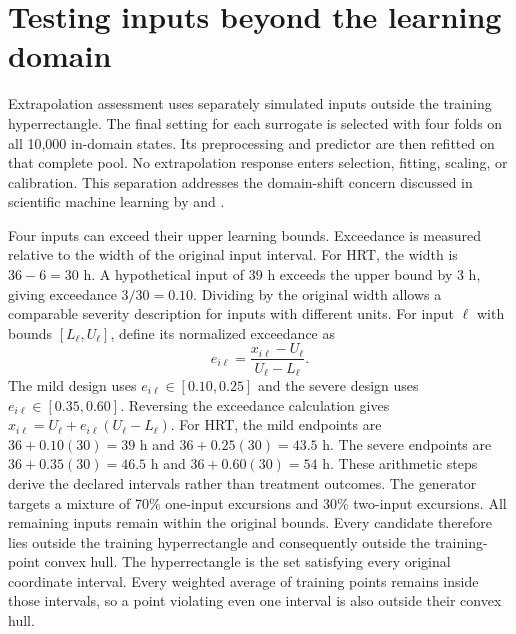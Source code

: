 \section{Testing inputs beyond the learning domain}

Extrapolation assessment uses separately simulated inputs outside the training hyperrectangle. The final setting for each surrogate is selected with four folds on all 10,000 in-domain states. Its preprocessing and predictor are then refitted on that complete pool. No extrapolation response enters selection, fitting, scaling, or calibration. This separation addresses the domain-shift concern discussed in scientific machine learning by \citet{Karniadakis2021} and \citet{Shen2023}.

Four inputs can exceed their upper learning bounds. Exceedance is measured relative to the width of the original input interval. For HRT, the width is $36-6=30$ h. A hypothetical input of 39 h exceeds the upper bound by 3 h, giving exceedance $3/30=0.10$. Dividing by the original width allows a comparable severity description for inputs with different units. For input $\ell$ with bounds $[L_\ell,U_\ell]$, define its normalized exceedance as
\begin{equation}
e_{i\ell}=\frac{x_{i\ell}-U_\ell}{U_\ell-L_\ell}.
\label{eq:projection_domain_exceedance}
\end{equation}
The mild design uses $e_{i\ell}\in[0.10,0.25]$ and the severe design uses $e_{i\ell}\in[0.35,0.60]$. Reversing the exceedance calculation gives $x_{i\ell}=U_\ell+e_{i\ell}(U_\ell-L_\ell)$. For HRT, the mild endpoints are $36+0.10(30)=39$ h and $36+0.25(30)=43.5$ h. The severe endpoints are $36+0.35(30)=46.5$ h and $36+0.60(30)=54$ h. These arithmetic steps derive the declared intervals rather than treatment outcomes. The generator targets a mixture of 70\% one-input excursions and 30\% two-input excursions. All remaining inputs remain within the original bounds. Every candidate therefore lies outside the training hyperrectangle and consequently outside the training-point convex hull. The hyperrectangle is the set satisfying every original coordinate interval. Every weighted average of training points remains inside those intervals, so a point violating even one interval is also outside their convex hull.

